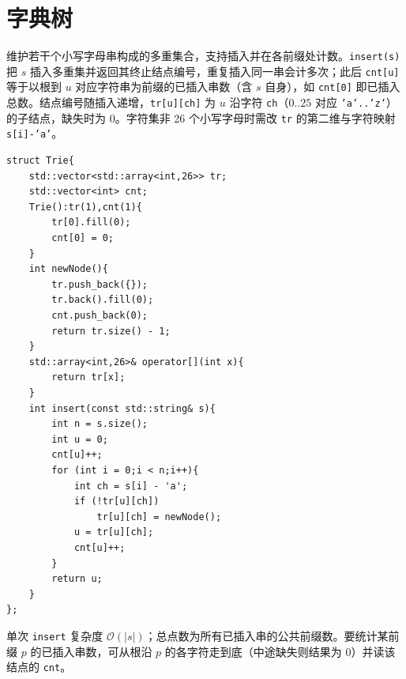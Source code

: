 \section{字典树}

维护若干个小写字母串构成的多重集合，支持插入并在各前缀处计数。\texttt{insert(s)} 把 $s$ 插入多重集并返回其终止结点编号，重复插入同一串会计多次；此后 \texttt{cnt[u]} 等于以根到 $u$ 对应字符串为前缀的已插入串数（含 $s$ 自身），如 \texttt{cnt[0]} 即已插入总数。结点编号随插入递增，\texttt{tr[u][ch]} 为 $u$ 沿字符 \texttt{ch}（$0..25$ 对应 \texttt{'a'..'z'}）的子结点，缺失时为 $0$。字符集非 26 个小写字母时需改 \texttt{tr} 的第二维与字符映射 \texttt{s[i]-'a'}。

\begin{lstlisting}
struct Trie{
    std::vector<std::array<int,26>> tr;
    std::vector<int> cnt;
    Trie():tr(1),cnt(1){
        tr[0].fill(0);
        cnt[0] = 0;
    }
    int newNode(){
        tr.push_back({});
        tr.back().fill(0);
        cnt.push_back(0);
        return tr.size() - 1;
    }
    std::array<int,26>& operator[](int x){
        return tr[x];
    }
    int insert(const std::string& s){
        int n = s.size();
        int u = 0;
        cnt[u]++;
        for (int i = 0;i < n;i++){
            int ch = s[i] - 'a';
            if (!tr[u][ch])
                tr[u][ch] = newNode();
            u = tr[u][ch];
            cnt[u]++;
        }
        return u;
    }
};
\end{lstlisting}

单次 \texttt{insert} 复杂度 $\mathcal{O}(|s|)$；总点数为所有已插入串的公共前缀数。要统计某前缀 $p$ 的已插入串数，可从根沿 $p$ 的各字符走到底（中途缺失则结果为 $0$）并读该结点的 \texttt{cnt}。
